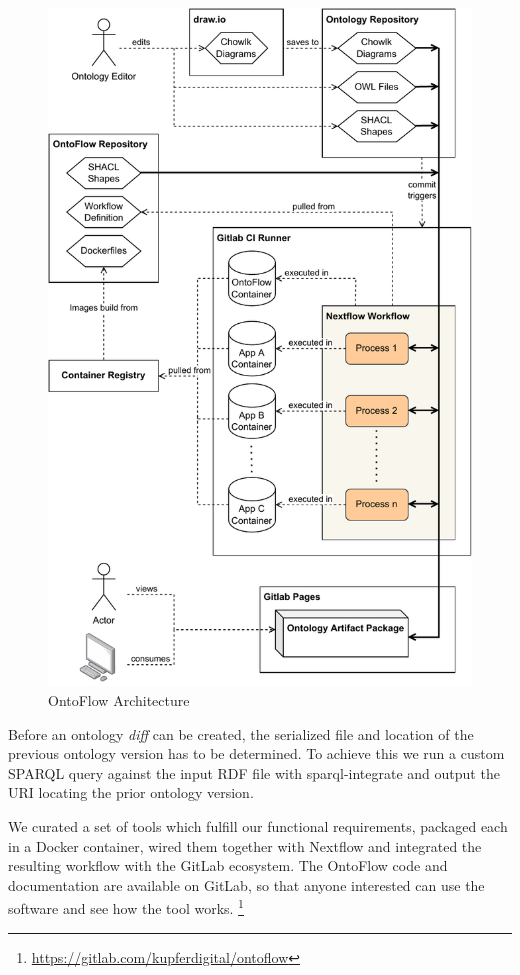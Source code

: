 \documentclass[runningheads]{llncs}
\begin{document}
\begin{figure}[htbp]
  \centering
  \includegraphics[width=.75\textwidth]{architecture.pdf}
  \caption{OntoFlow Architecture}
  \label{fig:architecture}
\end{figure}
Before an ontology \textit{diff} can be created, the serialized file and location of the previous ontology version has to be determined. To achieve this we run a custom SPARQL query against the input RDF file with sparql-integrate and output the URI locating the prior ontology version.

We curated a set of tools which fulfill our functional requirements, packaged each in a Docker container, wired them together with Nextflow and integrated the resulting workflow with the GitLab ecosystem. 
The OntoFlow code and documentation are available on GitLab, so that anyone interested can use the software and see how the tool works. \footnote{\url{https://gitlab.com/kupferdigital/ontoflow}}
\end{document}
